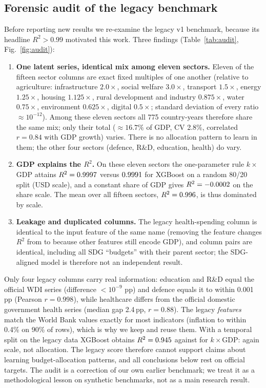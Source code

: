 \subsection{Forensic audit of the legacy benchmark}\label{sec:audit}
Before reporting new results we re-examine the legacy v1 benchmark, because its headline $R^2>0.99$ motivated this work. Three findings (Table~\ref{tab:audit}, Fig.~\ref{fig:audit}):
\begin{enumerate}
\item \textbf{One latent series, identical mix among eleven sectors.} Eleven of the fifteen sector columns are exact fixed multiples of one another (relative to agriculture: infrastructure $2.0\times$, social welfare $3.0\times$, transport $1.5\times$, energy $1.25\times$, housing $1.125\times$, rural development and industry $0.875\times$, water $0.75\times$, environment $0.625\times$, digital $0.5\times$; standard deviation of every ratio $\approx10^{-12}$). Among these eleven sectors all 775 country-years therefore share the same mix; only their total ($\approx16.7\%$ of GDP, CV 2.8\%, correlated $r=0.84$ with GDP growth) varies. There is no allocation pattern to learn in them; the other four sectors (defence, R\&D, education, health) do vary.
\item \textbf{GDP explains the $R^2$.} On these eleven sectors the one-parameter rule $k\times$GDP attains $R^2=0.9997$ versus $0.9991$ for XGBoost on a random 80/20 split (USD scale), and a constant share of GDP gives $R^2=-0.0002$ on the share scale. The mean over all fifteen sectors, $R^2=0.996$, is thus dominated by scale.
\item \textbf{Leakage and duplicated columns.} The legacy health-spending column is identical to the input feature of the same name (removing the feature changes $R^2$ from \LegHealthWith{} to \LegHealthWithout{} because other features still encode GDP), and \LegNIdent{} column pairs are identical, including all SDG ``budgets'' with their parent sector; the SDG-aligned model is therefore not an independent result.
\end{enumerate}
Only four legacy columns carry real information: education and R\&D equal the official WDI series (difference $<10^{-9}$ pp) and defence equals it to within 0.001\,pp (Pearson $r=0.998$), while healthcare differs from the official domestic government health series (median gap 2.4\,pp, $r=0.88$). The legacy \emph{features} match the World Bank values exactly for most indicators (inflation to within 0.4\% on 90\% of rows), which is why we keep and reuse them. With a temporal split on the legacy data XGBoost obtains $R^2=0.945$ against \LegTempFormula{} for $k\times$GDP: again scale, not allocation. The legacy score therefore cannot support claims about learning budget-allocation patterns, and all conclusions below rest on official targets. The audit is a correction of our own earlier benchmark; we treat it as a methodological lesson on synthetic benchmarks, not as a main research result.


